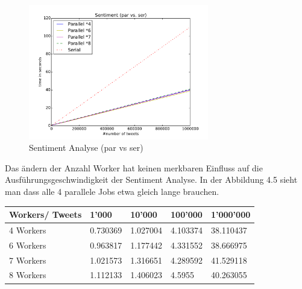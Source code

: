 \documentclass[12pt, oneside]{report}   	%
\begin{document}
\begin{figure}[h!]
\begin{center}
\includegraphics[width=0.7\textwidth]{bilder/time_senitment_par-ser.pdf}
\caption{Sentiment Analyse (par vs ser)}
\label{img:performancesentiment}
\end{center}
\end{figure}


Das ändern der Anzahl Worker hat keinen merkbaren Einfluss auf die Ausführungsgeschwindigkeit der Sentiment Analyse. In der Abbildung 4.5 sieht man dass alle 4 parallele Jobs etwa gleich lange brauchen.

\begin{table}[h]
    \begin{tabular}{|l|l|l|l|l|}
    \hline
    Workers/ Tweets         & 1'000    & 10'000   & 100'000  & 1'000'000 \\ \hline
    4 Workers & 0.730369 & 1.027004 & 4.103374 & 38.110437 \\ \hline
    6 Workers & 0.963817 & 1.177442 & 4.331552 & 38.666975 \\ \hline
    7 Workers & 1.021573 & 1.316651 & 4.289592 & 41.529118 \\ \hline
    8 Workers & 1.112133 & 1.406023 & 4.5955   & 40.263055 \\ \hline
    \end{tabular}
\end{table}
\end{document}
